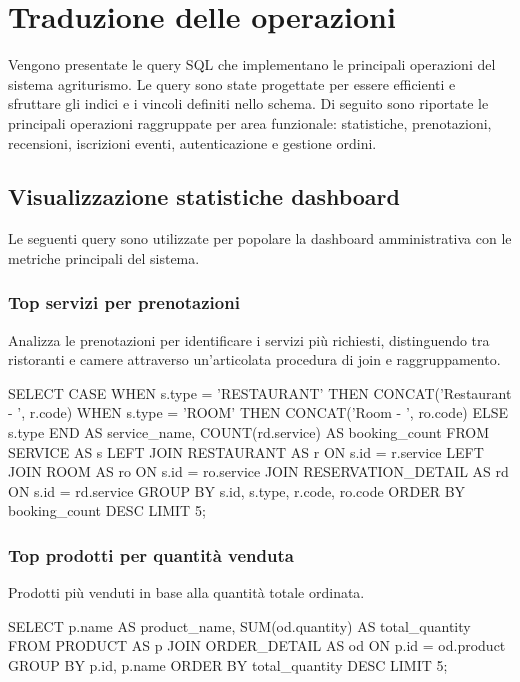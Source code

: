 \documentclass[a4paper,12pt]{report}
\begin{document}
\section{Traduzione delle operazioni}
Vengono presentate le query SQL che implementano le
principali operazioni del sistema agriturismo. Le query sono state
progettate per essere efficienti e sfruttare gli indici e i vincoli
definiti nello schema. Di seguito sono riportate le principali operazioni
raggruppate per area funzionale: statistiche, prenotazioni, recensioni,
iscrizioni eventi, autenticazione e gestione ordini.

\subsection{Visualizzazione statistiche dashboard}
Le seguenti query sono utilizzate per popolare la dashboard
amministrativa con le metriche principali del sistema.

\subsubsection{Top servizi per prenotazioni}
Analizza le prenotazioni per identificare i servizi più richiesti,
distinguendo tra ristoranti e camere attraverso un'articolata
procedura di join e raggruppamento.

\begin{sqlcode}[caption={}]
SELECT CASE
    WHEN s.type = 'RESTAURANT' THEN CONCAT('Restaurant - ', r.code)
    WHEN s.type = 'ROOM' THEN CONCAT('Room - ', ro.code)
    ELSE s.type
  END AS service_name,
  COUNT(rd.service) AS booking_count
FROM SERVICE AS s
LEFT JOIN RESTAURANT AS r ON s.id = r.service
LEFT JOIN ROOM AS ro ON s.id = ro.service
JOIN RESERVATION_DETAIL AS rd ON s.id = rd.service
GROUP BY s.id, s.type, r.code, ro.code
ORDER BY booking_count DESC
LIMIT 5;
\end{sqlcode}

\subsubsection{Top prodotti per quantità venduta}
Prodotti più venduti in base alla quantità totale ordinata.

\begin{sqlcode}[caption={}]
SELECT
  p.name AS product_name,
  SUM(od.quantity) AS total_quantity
FROM PRODUCT AS p
JOIN ORDER_DETAIL AS od ON p.id = od.product
GROUP BY p.id, p.name
ORDER BY total_quantity DESC
LIMIT 5;
\end{sqlcode}
\end{document}
